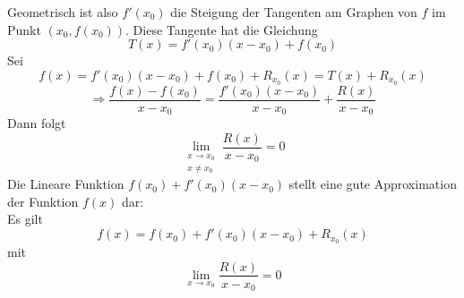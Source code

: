 Geometrisch ist also $f'\left( x_0\right)$ die Steigung der Tangenten am Graphen von $f$ im Punkt $\left( x_0,f\left( x_0\right) \right)$. Diese Tangente hat die Gleichung 
\[T(x) = f'\left( {{x_0}} \right)\left( {x - {x_0}} \right) + f\left( {{x_0}} \right)\]
Sei 
\[f\left( x \right)= f'\left( {{x_0}} \right)\left( {x - {x_0}} \right) + f\left( {{x_0}} \right) + {R_{{x_0}}}\left( x \right) = T\left( x \right) + {R_{{x_0}}}\left( x \right)\]
\[ \Rightarrow \frac{{f\left( x \right) - f\left( {{x_0}} \right)}}{{x - {x_0}}} = \frac{{f'\left( {{x_0}} \right)\left( {x - {x_0}} \right)}}{{x - {x_0}}} + \frac{{R\left( x \right)}}{{x - {x_0}}}\]
Dann folgt 
\[\mathop {\lim }\limits_{\begin{array}{*{20}{c}}
{x \to {x_0}}\\
{x\not  = {x_0}}
\end{array}} \frac{{R\left( x \right)}}{{x - {x_0}}} = 0\]
Die Lineare Funktion $f\left( {{x_0}} \right) + f'\left( {{x_0}} \right)\left( {x - {x_0}} \right)$ stellt eine gute Approximation der Funktion $f(x)$ dar:\\

\noindent Es gilt
\[f\left( x \right) = f\left( {{x_0}} \right) + f'\left( {{x_0}} \right)\left( {x - {x_0}} \right) + {R_{{x_0}}}\left( x \right)\]
mit 
\[\mathop {\lim }\limits_{x \to {x_0}} \frac{{R\left( x \right)}}{{x - {x_0}}} = 0\]
